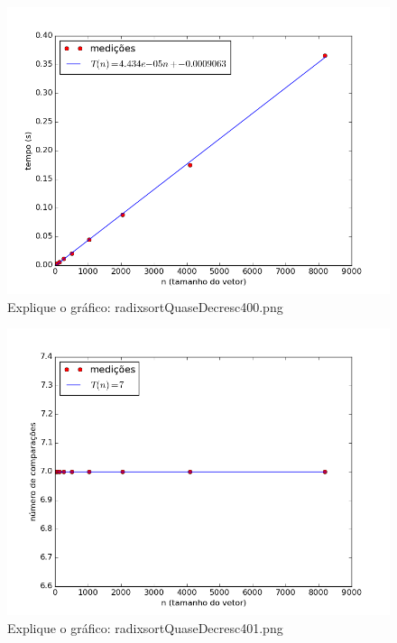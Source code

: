 \documentclass[12pt,a4paper,twoside]{report}
\begin{document}


\begin{figure}[ht]
\centering \includegraphics[scale=0.8]{../radixsort/imagens/radixsortQuaseDecresc400.png}
\caption{Explique o gráfico: radixsortQuaseDecresc400.png}
\label{fig:radixsortQuaseDecresc400}
\end{figure}

\begin{figure}[ht]
\centering \includegraphics[scale=0.8]{../radixsort/imagens/radixsortQuaseDecresc401.png}
\caption{Explique o gráfico: radixsortQuaseDecresc401.png}
\label{fig:radixsortQuaseDecresc401}
\end{figure}
\end{document}
